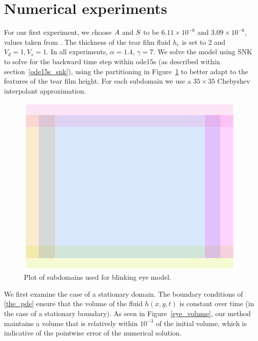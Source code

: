 \section{Numerical experiments}
\label{eye_experiments}
For our first experiment, we choose $A$ and $S$ to be $6.11 \times 10^{-6}$ and $3.09 \times 10^{-6}$, values taken from \cite{braun2015dynamics}. The thickness of the tear film fluid $h_e$ is set to 2 and $V_d=1, V_s=1$. In all experiments, $\alpha=1.4$, $\gamma=7$. We solve the model using SNK to solve for the backward time step within ode15s (as described within section~\ref{ode15s_snk}), using the partitioning in Figure~\ref{eye_partition} to better adapt to the features of the tear film height. For each subdomain we use a $35 \times 35$ Chebyshev interpolant approximation.
\begin{figure}
	\centering
	\includegraphics[scale=0.6]{Chapter4/Eye_domains}
	\caption{Plot of subdomains used for blinking eye model.}
	\label{eye_partition}
\end{figure}

We first examine the case of a stationary domain. The boundary conditions of \ref{the_pde} ensure that the volume of the fluid $h(x,y,t)$ is constant over time (in the case of a stationary boundary). As seen in Figure~\ref{eye_volume}, our method maintains a volume that is relatively within $10^{-3}$ of the initial volume, which is indicative of the pointwise error of the numerical solution.

